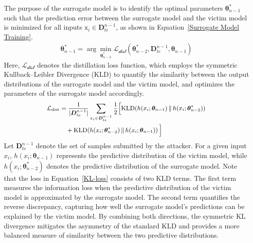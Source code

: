 The purpose of the surrogate model is to identify the optimal parameters $\bm{\theta}_{n-1}^{*}$ such that the prediction error between the surrogate model and the victim model is minimized for all inputs $\bm{\mathrm{x}}_{i} \in \bm{D}_{te}^{n-1}$, as shown in Equation~\ref{Surrogate Model Training}.
\begin{equation}
	\begin{aligned}
		\bm{\theta}_{n-1}^{*} = \arg\min_{\bm{\theta}_{n-2}^{*}} \mathcal{L_{\text{dist}}} \left( \bm{\theta}_{n-2}^{*}, \bm{D}_{te}^{n-1} , \bm{\theta}_{n-1} \right)
	\end{aligned}
	\label{Surrogate Model Training}
\end{equation}
Here, $\mathcal{L_{\text{dist}}}$ denotes the distillation loss function, which employs the symmetric Kullback–Leibler Divergence (KLD) to quantify the similarity between the output distributions of the surrogate model and the victim model, and optimizes the parameters of the surrogate model accordingly.
\begin{equation}
	\small
	\begin{aligned}
		\mathcal{L_{\text{dist}}} 
		&= \frac{1}{|\bm{D}_{te}^{n-1}|} \sum_{x_i \in \bm{D}_{te}^{n-1}} \frac{1}{2} \Big[ 
		\mathrm{KLD}\!\left(h(x_i; \bm{\theta}_{n-1})\,\|\,h(x_i; \bm{\theta}_{n-2}^{*} )\right) \\
		&\quad + \mathrm{KLD}\!\left(h(x_i; \bm{\theta}_{n-2}^{*})\,\|\,h(x_i; \bm{\theta}_{n-1})\right) \Big]
	\end{aligned}
	\label{KL-loss}
\end{equation}
Let $\bm{D}_{te}^{n-1}$ denote the set of samples submitted by the attacker.
For a given input $x_i$, $h(x_i; \bm{\theta}_{n-1})$ represents the predictive distribution of the victim model, while $h(x_i; \bm{\theta}_{n-2}^{*})$ denotes the predictive distribution of the surrogate model.
Note that the loss in Equation~\ref{KL-loss} consists of two KLD terms. 
The first term measures the information loss when the predictive distribution of the victim model is approximated by the surrogate model. 
The second term quantifies the reverse discrepancy, capturing how well the surrogate model’s predictions can be explained by the victim model. 
By combining both directions, the symmetric KL divergence mitigates the asymmetry of the standard KLD and provides a more balanced measure of similarity between the two predictive distributions.
